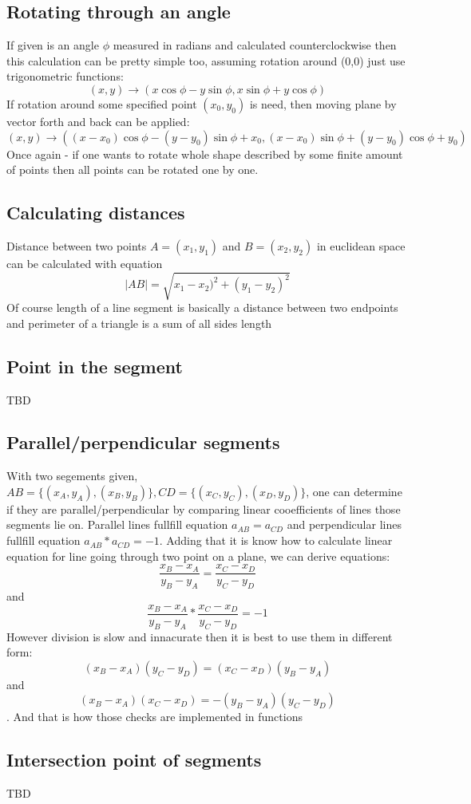 \documentclass{article}
\begin{document}
\subsection{Rotating through an angle}
If given is an angle $ \phi $ measured in radians and calculated counterclockwise then this calculation can be pretty simple too, assuming rotation around (0,0) just use trigonometric functions: 
$$ (x,y) \rightarrow  (x\cos\phi-y\sin\phi, x\sin\phi+y\cos\phi) $$
If rotation around some specified point $ (x_0,y_0) $ is need, then moving plane by vector forth and back can be applied:
$$ (x,y) \rightarrow ((x-x_0)\cos\phi-(y-y_0)\sin\phi + x_0, (x-x_0)\sin\phi+(y-y_0)\cos\phi + y_0) $$
Once again - if one wants to rotate whole shape described by some finite amount of points then all points can be rotated one by one.
\subsection{Calculating distances}
Distance between two points $ A = (x_1,y_1) $ and $ B = (x_2,y_2) $ in euclidean space can be calculated with equation 
$$ |AB| = \sqrt{x_1-x_2)^2+(y_1-y_2)^2} $$
Of course length of a line segment is basically a distance between two endpoints and perimeter of a triangle is a sum of all sides length
\subsection{Point in the segment}
TBD
\subsection{Parallel/perpendicular segments}
With two segements given, $AB = \{(x_A,y_A),(x_B,y_B)\}, CD = \{(x_C,y_C),(x_D,y_D)\} $, one can determine if they are parallel/perpendicular by comparing linear cooefficients of lines those segments lie on.
Parallel lines fullfill equation $ a_{AB} = a_{CD} $ and perpendicular lines fullfill equation $ a_{AB} * a_{CD} = -1 $. Adding that it is know how to calculate linear equation for line going through two point on a plane, we can derive equations:
$$ \frac{x_B-x_A}{y_B-y_A} = \frac{x_C - x_D}{y_C-y_D} $$
and
$$ \frac{x_B-x_A}{y_B-y_A}*\frac{x_C - x_D}{y_C-y_D} = -1 $$
However division is slow and innacurate then it is best to use them in different form:
$$ (x_B-x_A)(y_C-y_D) = (x_C - x_D)(y_B-y_A) $$
and
$$ (x_B-x_A)(x_C - x_D) = -(y_B-y_A)(y_C-y_D) $$.
And that is how those checks are implemented in functions
\subsection{Intersection point of segments}
TBD
\end{document}
